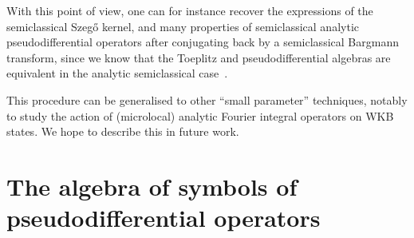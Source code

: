 \documentclass[10pt]{amsart}
\theoremstyle{definition}\newtheorem{defi}[theo]{Definition}\newtheorem{rema}[theo]{Remark}\newtheorem{exam}[theo]{Example}\newtheorem{exem}[theo]{Example}\newtheorem{nota}[theo]{Notation}
\newcommand\1{\mathds{1}}
\begin{document}
With this point of view, one can for instance recover the expressions of the semiclassical Szeg\H{o} kernel, and many properties of semiclassical analytic pseudodifferential operators after conjugating back by a semiclassical Bargmann transform, since we know that the Toeplitz and pseudodifferential algebras are equivalent in the analytic semiclassical case~\cite{rouby_analytic_2018}.

This procedure can be generalised to other ``small parameter'' techniques, notably to study the action of (microlocal) analytic Fourier integral operators on WKB states. We hope to describe this in future work.


\appendix

\section{The algebra of symbols of pseudodifferential operators}\label{sec:algebra-symb-pseud}
\end{document}
